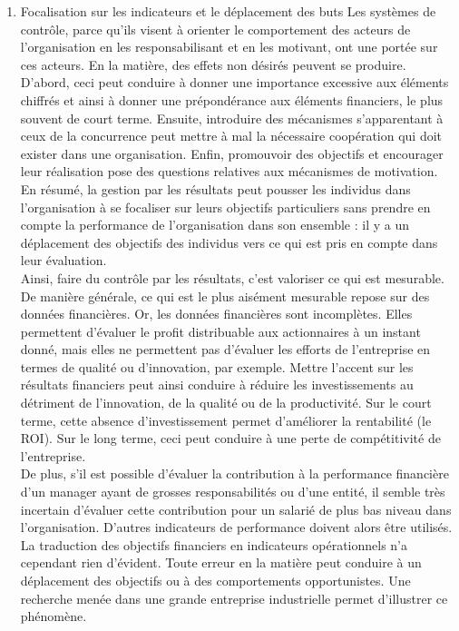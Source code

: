\documentclass{tufte-handout}
\begin{document}
\begin{enumerate}
\item Focalisation sur les indicateurs et le déplacement des buts
\label{sec:orgb233051}
Les systèmes de contrôle, parce qu’ils visent à orienter le comportement des acteurs de l’organisation en les responsabilisant et en les motivant, ont une portée sur ces acteurs. En la matière, des effets non désirés peuvent se produire. D’abord, ceci peut conduire à donner une importance excessive aux éléments chiffrés et ainsi à donner une prépondérance aux éléments financiers, le plus souvent de court terme. Ensuite, introduire des mécanismes s’apparentant à ceux de la concurrence peut mettre à mal la nécessaire coopération qui doit exister dans une organisation. Enfin, promouvoir des objectifs et encourager leur réalisation pose des questions relatives aux mécanismes de motivation. En résumé, la gestion par les résultats peut pousser les individus dans l’organisation à se focaliser sur leurs objectifs particuliers sans prendre en compte la performance de l’organisation dans son ensemble : il y a un déplacement des objectifs des individus vers ce qui est pris en compte dans leur évaluation.\\

Ainsi, faire du contrôle par les résultats, c’est valoriser ce qui est mesurable. De manière générale, ce qui est le plus aisément mesurable repose sur des données financières. Or, les données financières sont incomplètes. Elles permettent d’évaluer le profit distribuable aux actionnaires à un instant donné, mais elles ne permettent pas d’évaluer les efforts de l’entreprise en termes de qualité ou d’innovation, par exemple. Mettre l’accent sur les résultats financiers peut ainsi conduire à réduire les investissements au détriment de l’innovation, de la qualité ou de la productivité. Sur le court terme, cette absence d’investissement permet d’améliorer la rentabilité (le ROI). Sur le long terme, ceci peut conduire à une perte de compétitivité de l’entreprise.\\

De plus, s’il est possible d’évaluer la contribution à la performance financière d’un manager ayant de grosses responsabilités ou d’une entité, il semble très incertain d’évaluer cette contribution pour un salarié de plus bas niveau dans l’organisation. D’autres indicateurs de performance doivent alors être utilisés. La traduction des objectifs financiers en indicateurs opérationnels n’a cependant rien d’évident. Toute erreur en la matière peut conduire à un déplacement des objectifs ou à des comportements opportunistes. Une recherche menée dans une grande entreprise industrielle permet d’illustrer ce phénomène.\\


\end{enumerate}
\end{document}
